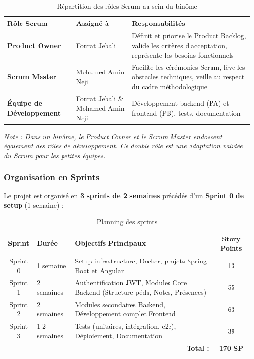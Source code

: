 \documentclass[12pt,a4paper]{report}
\begin{document}
\begin{table}[H]
\centering
\caption{Répartition des rôles Scrum au sein du binôme}
\begin{tabular}{|p{4cm}|p{4cm}|p{6cm}|}
\hline
\textbf{Rôle Scrum} & \textbf{Assigné à} & \textbf{Responsabilités} \\
\hline
\textbf{Product Owner} & Fourat Jebali & Définit et priorise le Product Backlog, valide les critères d'acceptation, représente les besoins fonctionnels \\
\hline
\textbf{Scrum Master} & Mohamed Amin Neji & Facilite les cérémonies Scrum, lève les obstacles techniques, veille au respect du cadre méthodologique \\
\hline
\textbf{Équipe de Développement} & Fourat Jebali \& Mohamed Amin Neji & Développement backend (PA) et frontend (PB), tests, documentation \\
\hline
\end{tabular}
\end{table}

\textit{Note : Dans un binôme, le Product Owner et le Scrum Master endossent également des rôles de développement. Ce double rôle est une adaptation validée du Scrum pour les petites équipes.}

\subsubsection{Organisation en Sprints}

Le projet est organisé en \textbf{3 sprints de 2 semaines} précédés d'un \textbf{Sprint 0 de setup} (1 semaine) :

\begin{table}[H]
\centering
\caption{Planning des sprints}
\begin{tabular}{|c|p{3cm}|p{8cm}|c|}
\hline
\textbf{Sprint} & \textbf{Durée} & \textbf{Objectifs Principaux} & \textbf{Story Points} \\
\hline
Sprint 0 & 1 semaine & Setup infrastructure, Docker, projets Spring Boot et Angular & 13 \\
\hline
Sprint 1 & 2 semaines & Authentification JWT, Modules Core Backend (Structure péda, Notes, Présences) & 55 \\
\hline
Sprint 2 & 2 semaines & Modules secondaires Backend, Développement complet Frontend & 63 \\
\hline
Sprint 3 & 1-2 semaines & Tests (unitaires, intégration, e2e), Déploiement, Documentation & 39 \\
\hline
\multicolumn{3}{|r|}{\textbf{Total :}} & \textbf{170 SP} \\
\hline
\end{tabular}
\end{table}
\end{document}
